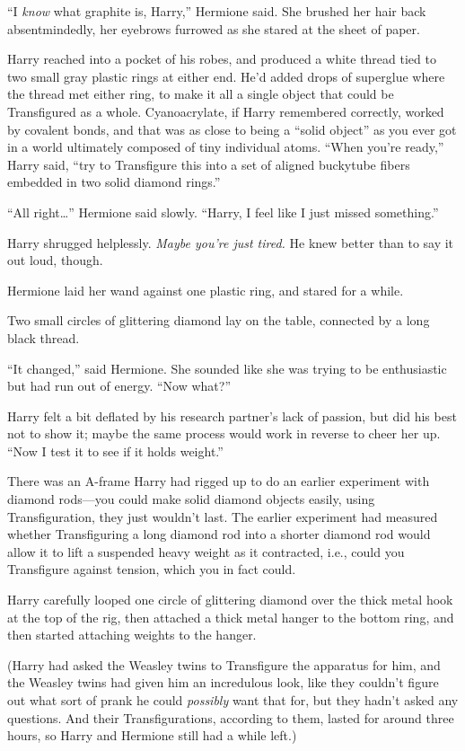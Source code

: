 ``I \emph{know} what graphite is, Harry,'' Hermione said. She brushed
her hair back absentmindedly, her eyebrows furrowed as she stared at the
sheet of paper.

Harry reached into a pocket of his robes, and produced a white thread
tied to two small gray plastic rings at either end. He'd added drops of
superglue where the thread met either ring, to make it all a single
object that could be Transfigured as a whole. Cyanoacrylate, if Harry
remembered correctly, worked by covalent bonds, and that was as close to
being a ``solid object'' as you ever got in a world ultimately composed
of tiny individual atoms. ``When you're ready,'' Harry said, ``try to
Transfigure this into a set of aligned buckytube fibers embedded in two
solid diamond rings.''

``All right\ldots{}'' Hermione said slowly. ``Harry, I feel like I just
missed something.''

Harry shrugged helplessly. \emph{Maybe you're just tired.} He knew
better than to say it out loud, though.

Hermione laid her wand against one plastic ring, and stared for a while.

Two small circles of glittering diamond lay on the table, connected by a
long black thread.

``It changed,'' said Hermione. She sounded like she was trying to be
enthusiastic but had run out of energy. ``Now what?''

Harry felt a bit deflated by his research partner's lack of passion, but
did his best not to show it; maybe the same process would work in
reverse to cheer her up. ``Now I test it to see if it holds weight.''

There was an A-frame Harry had rigged up to do an earlier experiment
with diamond rods---you could make solid diamond objects easily, using
Transfiguration, they just wouldn't last. The earlier experiment had
measured whether Transfiguring a long diamond rod into a shorter diamond
rod would allow it to lift a suspended heavy weight as it contracted,
i.e., could you Transfigure against tension, which you in fact could.

Harry carefully looped one circle of glittering diamond over the thick
metal hook at the top of the rig, then attached a thick metal hanger to
the bottom ring, and then started attaching weights to the hanger.

(Harry had asked the Weasley twins to Transfigure the apparatus for him,
and the Weasley twins had given him an incredulous look, like they
couldn't figure out what sort of prank he could \emph{possibly} want
that for, but they hadn't asked any questions. And their
Transfigurations, according to them, lasted for around three hours, so
Harry and Hermione still had a while left.)

